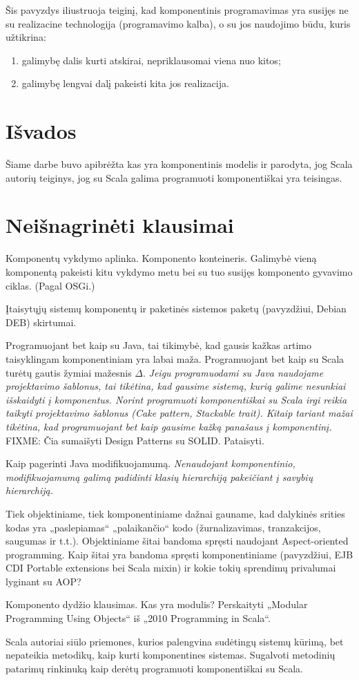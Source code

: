 Šis pavyzdys iliustruoja teiginį, kad komponentinis programavimas yra
susijęs ne su realizacine technologija (programavimo kalba), o su
jos naudojimo būdu, kuris užtikrina:
\begin{enumerate}
  \item galimybę dalis kurti atskirai, nepriklausomai viena nuo kitos;
  \item galimybę lengvai dalį pakeisti kita jos realizacija.
\end{enumerate}

\chapter{Išvados}

Šiame darbe buvo apibrėžta kas yra komponentinis modelis ir parodyta,
jog Scala autorių teiginys, jog su Scala galima programuoti
komponentiškai yra teisingas.

\chapter{Neišnagrinėti klausimai}

Komponentų vykdymo aplinka. Komponento konteineris. Galimybė vieną
komponentą pakeisti kitu vykdymo metu bei su tuo susijęs komponento
gyvavimo ciklas. (Pagal OSGi.)

Įtaisytųjų  sistemų komponentų ir paketinės sistemos
paketų (pavyzdžiui, Debian DEB) skirtumai.

Programuojant bet kaip su Java, tai tikimybė, kad gausis kažkas artimo
taisyklingam komponentiniam yra labai maža. Programuojant bet kaip su
Scala turėtų gautis žymiai mažesnis $\Delta$. \emph{Jeigu programuodami
su Java naudojame projektavimo šablonus, tai tikėtina, kad gausime
sistemą, kurią galime nesunkiai išskaidyti į komponentus. Norint
programuoti komponentiškai su Scala irgi reikia taikyti projektavimo
šablonus (Cake pattern, Stackable trait). Kitaip tariant mažai tikėtina,
kad programuojant bet kaip gausime kažką panašaus į komponentinį.}
FIXME: Čia sumaišyti Design Patterns su SOLID. Pataisyti.

Kaip pagerinti Java modifikuojamumą. \emph{Nenaudojant komponentinio,
modifikuojamumą galimą padidinti klasių hierarchiją pakeičiant
į savybių hierarchiją.}

Tiek objektiniame, tiek komponentiniame dažnai gauname, kad dalykinės
srities kodas yra „paslepiamas“ „palaikančio“ kodo (žurnalizavimas,
tranzakcijos, saugumas ir t.t.). Objektiniame šitai bandoma spręsti
naudojant Aspect-oriented programming. Kaip šitai yra bandoma
spręsti komponentiniame (pavyzdžiui, EJB CDI Portable extensions
bei Scala mixin) ir kokie tokių sprendimų privalumai lyginant su AOP?

Komponento dydžio klausimas. Kas yra modulis? Perskaityti „Modular
Programming Using Objects“ iš „2010 Programming in Scala“.

Scala autoriai siūlo priemones, kurios palengvina sudėtingų sistemų
kūrimą, bet nepateikia metodikų, kaip kurti komponentines sistemas.
Sugalvoti metodinių patarimų rinkinuką kaip derėtų programuoti
komponentiškai su Scala.
